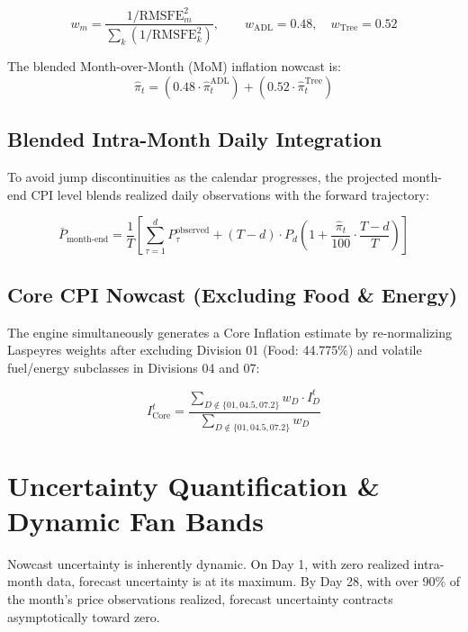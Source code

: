 \documentclass[11pt,a4paper]{article}
\begin{document}
\begin{equation}
    w_m = \frac{1 / \text{RMSFE}_m^2}{\sum_{k} (1 / \text{RMSFE}_k^2)}, \qquad w_{\text{ADL}} = 0.48, \quad w_{\text{Tree}} = 0.52
\end{equation}

The blended Month-over-Month (MoM) inflation nowcast is:
\begin{equation}
    \hat{\pi}_t = \left( 0.48 \cdot \hat{\pi}_t^{\text{ADL}} \right) + \left( 0.52 \cdot \hat{\pi}_t^{\text{Tree}} \right)
\end{equation}

\subsection{Blended Intra-Month Daily Integration}

To avoid jump discontinuities as the calendar progresses, the projected month-end CPI level blends realized daily observations with the forward trajectory:

\begin{equation}
    \bar{P}_{\text{month-end}} = \frac{1}{T} \left[ \sum_{\tau=1}^{d} P_{\tau}^{\text{observed}} + (T - d) \cdot P_d \left( 1 + \frac{\hat{\pi}_t}{100} \cdot \frac{T - d}{T} \right) \right]
\end{equation}

\subsection{Core CPI Nowcast (Excluding Food \& Energy)}

The engine simultaneously generates a Core Inflation estimate by re-normalizing Laspeyres weights after excluding Division 01 (Food: 44.775\%) and volatile fuel/energy subclasses in Divisions 04 and 07:

\begin{equation}
    I_{\text{Core}}^t = \frac{\sum_{D \notin \{01, 04.5, 07.2\}} w_D \cdot I_D^t}{\sum_{D \notin \{01, 04.5, 07.2\}} w_D}
\end{equation}

\section{Uncertainty Quantification \& Dynamic Fan Bands}

Nowcast uncertainty is inherently dynamic. On Day 1, with zero realized intra-month data, forecast uncertainty is at its maximum. By Day 28, with over 90\% of the month's price observations realized, forecast uncertainty contracts asymptotically toward zero.
\end{document}
